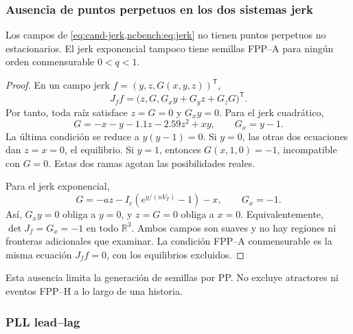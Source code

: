 \subsubsection{Ausencia de puntos perpetuos en los dos sistemas jerk}
\label{subsec:pp-jerk-exclusion}

\begin{proposition}
\label{prop:pp-jerk-exclusion}
Los campos de \cref{eq:cand-jerk,ncbench:eq:jerk} no tienen puntos perpetuos
no estacionarios. El jerk exponencial tampoco tiene semillas FPP--A para
ningún orden conmensurable \(0<q<1\).
\end{proposition}

\begin{proof}
En un campo jerk \(f=(y,z,G(x,y,z))^{\mathsf T}\),
\begin{equation}
 J_ff=\bigl(z,G,G_xy+G_yz+G_zG\bigr)^{\mathsf T}.
 \label{eq:pp-jerk-general-acceleration}
\end{equation}
Por tanto, toda raíz satisface \(z=G=0\) y \(G_xy=0\).
Para el jerk cuadrático,
\[
 G=-x-y-1.1z-2.59z^2+xy,\qquad G_x=y-1.
\]
La última condición se reduce a \(y(y-1)=0\). Si \(y=0\), las otras
dos ecuaciones dan \(z=x=0\), el equilibrio. Si \(y=1\), entonces
\(G(x,1,0)=-1\), incompatible con \(G=0\). Estas dos ramas agotan las
posibilidades reales.

Para el jerk exponencial,
\[
 G=-az-I_c\left(e^{y/(nV_T)}-1\right)-x,\qquad G_x=-1.
\]
Así, \(G_xy=0\) obliga a \(y=0\), y \(z=G=0\) obliga a \(x=0\).
Equivalentemente, \(\det J_f=G_x=-1\) en todo \(\mathbb R^3\).
Ambos campos son suaves y no hay regiones ni fronteras adicionales que
examinar. La condición FPP--A conmensurable es la misma ecuación
\(J_ff=0\), con los equilibrios excluidos.
\end{proof}

Esta ausencia limita la generación de semillas por PP. No excluye
atractores ni eventos FPP--H a lo largo de una historia.

\subsubsection{PLL lead--lag}

